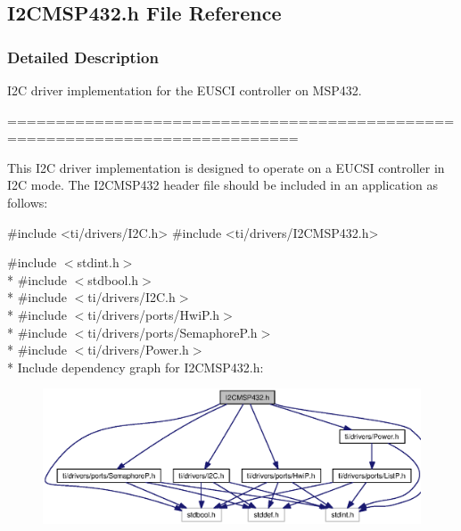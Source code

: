 \subsection{I2\+C\+M\+S\+P432.\+h File Reference}
\label{_i2_c_m_s_p432_8h}


\subsubsection{Detailed Description}
I2\+C driver implementation for the E\+U\+S\+C\+I controller on M\+S\+P432. 

============================================================================

This I2\+C driver implementation is designed to operate on a E\+U\+C\+S\+I controller in I2\+C mode. The I2\+C\+M\+S\+P432 header file should be included in an application as follows\+: 
\begin{DoxyCode}
\textcolor{preprocessor}{#include <ti/drivers/I2C.h>}
\textcolor{preprocessor}{#include <ti/drivers/I2CMSP432.h>}
\end{DoxyCode}
 

{\ttfamily \#include $<$stdint.\+h$>$}\\*
{\ttfamily \#include $<$stdbool.\+h$>$}\\*
{\ttfamily \#include $<$ti/drivers/\+I2\+C.\+h$>$}\\*
{\ttfamily \#include $<$ti/drivers/ports/\+Hwi\+P.\+h$>$}\\*
{\ttfamily \#include $<$ti/drivers/ports/\+Semaphore\+P.\+h$>$}\\*
{\ttfamily \#include $<$ti/drivers/\+Power.\+h$>$}\\*
Include dependency graph for I2\+C\+M\+S\+P432.\+h\+:
\nopagebreak
\begin{figure}[H]
\begin{center}
\leavevmode
\includegraphics[width=350pt]{_i2_c_m_s_p432_8h__incl}
\end{center}
\end{figure}
